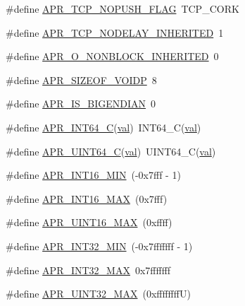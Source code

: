 \begin{DoxyCompactItemize}
\item 
\#define \hyperlink{group__apr__platform_ga6e74a453e90a6495a981f5f312ec6beb}{A\+P\+R\+\_\+\+T\+C\+P\+\_\+\+N\+O\+P\+U\+S\+H\+\_\+\+F\+L\+AG}~T\+C\+P\+\_\+\+C\+O\+RK
\item 
\#define \hyperlink{group__apr__platform_ga22df092ebdce7f9f8c6611d974a4ae82}{A\+P\+R\+\_\+\+T\+C\+P\+\_\+\+N\+O\+D\+E\+L\+A\+Y\+\_\+\+I\+N\+H\+E\+R\+I\+T\+ED}~1
\item 
\#define \hyperlink{group__apr__platform_gac6a178e9f749311c8f3a98da3dfd321d}{A\+P\+R\+\_\+\+O\+\_\+\+N\+O\+N\+B\+L\+O\+C\+K\+\_\+\+I\+N\+H\+E\+R\+I\+T\+ED}~0
\item 
\#define \hyperlink{group__apr__platform_gaa7a2a1de7949f09e29edae60b0d4c27f}{A\+P\+R\+\_\+\+S\+I\+Z\+E\+O\+F\+\_\+\+V\+O\+I\+DP}~8
\item 
\#define \hyperlink{group__apr__platform_gabf5174c5d522e1a149cbb38a4310743f}{A\+P\+R\+\_\+\+I\+S\+\_\+\+B\+I\+G\+E\+N\+D\+I\+AN}~0
\item 
\#define \hyperlink{group__apr__platform_gaae749817bb595cd5dcb9c17c119ddb13}{A\+P\+R\+\_\+\+I\+N\+T64\+\_\+C}(\hyperlink{group__apr__tables_ga4d708cd93abeca73400ed82977502830}{val})~I\+N\+T64\+\_\+C(\hyperlink{group__apr__tables_ga4d708cd93abeca73400ed82977502830}{val})
\item 
\#define \hyperlink{group__apr__platform_gaede133b7384b6a7a08c51cf1fa9c4001}{A\+P\+R\+\_\+\+U\+I\+N\+T64\+\_\+C}(\hyperlink{group__apr__tables_ga4d708cd93abeca73400ed82977502830}{val})~U\+I\+N\+T64\+\_\+C(\hyperlink{group__apr__tables_ga4d708cd93abeca73400ed82977502830}{val})
\item 
\#define \hyperlink{group__apr__platform_ga93b69f6b2d426b30c991a74f55be5308}{A\+P\+R\+\_\+\+I\+N\+T16\+\_\+\+M\+IN}~(-\/0x7fff -\/ 1)
\item 
\#define \hyperlink{group__apr__platform_gac4180108ae7cfe8b7f636183368c89c5}{A\+P\+R\+\_\+\+I\+N\+T16\+\_\+\+M\+AX}~(0x7fff)
\item 
\#define \hyperlink{group__apr__platform_ga2b7a0eb7506ac0bfc4d711929f9a3a48}{A\+P\+R\+\_\+\+U\+I\+N\+T16\+\_\+\+M\+AX}~(0xffff)
\item 
\#define \hyperlink{group__apr__platform_gaa99bd633c3478131fa672559601a76e7}{A\+P\+R\+\_\+\+I\+N\+T32\+\_\+\+M\+IN}~(-\/0x7fffffff -\/ 1)
\item 
\#define \hyperlink{group__apr__platform_ga0966ef0d235765d9fe1b9900fbe04faa}{A\+P\+R\+\_\+\+I\+N\+T32\+\_\+\+M\+AX}~0x7fffffff
\item 
\#define \hyperlink{group__apr__platform_ga239c26656c361f627f7db619997abaac}{A\+P\+R\+\_\+\+U\+I\+N\+T32\+\_\+\+M\+AX}~(0xffffffff\+U)

\end{DoxyCompactItemize}
